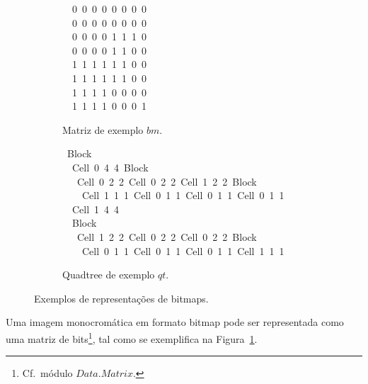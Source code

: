 \documentclass[a4paper]{article}
\newcommand{\Conid}[1]{\mathit{#1}}
\newcommand{\Varid}[1]{\mathit{#1}}
\begin{document}
\begin{figure}
\begin{subfigure}{0.3\textwidth}
\begin{tabbing}\ttfamily
~~0~0~0~0~0~0~0~0~\\
\ttfamily ~~0~0~0~0~0~0~0~0~\\
\ttfamily ~~0~0~0~0~1~1~1~0~\\
\ttfamily ~~0~0~0~0~1~1~0~0~\\
\ttfamily ~~1~1~1~1~1~1~0~0~\\
\ttfamily ~~1~1~1~1~1~1~0~0~\\
\ttfamily ~~1~1~1~1~0~0~0~0~\\
\ttfamily ~~1~1~1~1~0~0~0~1~
\end{tabbing}
\caption{Matriz de exemplo \ensuremath{\Varid{bm}}.}
\label{fig:bm}
\end{subfigure}
\begin{subfigure}{0.7\textwidth}
\begin{tabbing}\ttfamily
~Block\\
\ttfamily ~~Cell~0~4~4~Block\\
\ttfamily ~~~Cell~0~2~2~Cell~0~2~2~Cell~1~2~2~Block\\
\ttfamily ~~~~Cell~1~1~1~Cell~0~1~1~Cell~0~1~1~Cell~0~1~1\\
\ttfamily ~~Cell~1~4~4\\
\ttfamily ~~Block\\
\ttfamily ~~~Cell~1~2~2~Cell~0~2~2~Cell~0~2~2~Block\\
\ttfamily ~~~~Cell~0~1~1~Cell~0~1~1~Cell~0~1~1~Cell~1~1~1
\end{tabbing}
\caption{Quadtree de exemplo \ensuremath{\Varid{qt}}.}
\label{fig:qt}
\end{subfigure}
\caption{Exemplos de representações de bitmaps.}
\end{figure}

Uma imagem monocromática em formato bitmap pode ser representada como uma
matriz de bits\footnote{Cf.\ módulo \href{https://hackage.haskell.org/package/matrix}{\ensuremath{\Conid{\Conid{Data}.Matrix}}}.},
tal como se exemplifica na Figura~\ref{fig:bm}.
\end{document}

